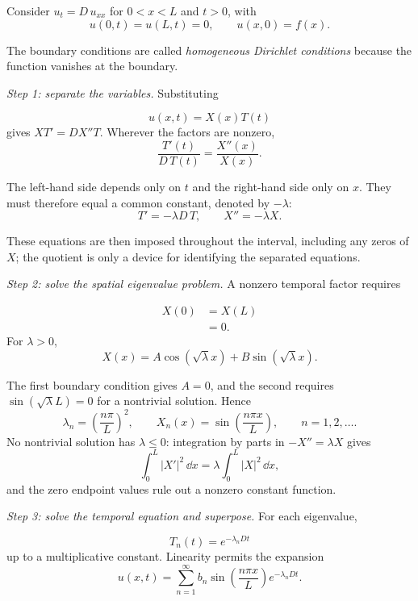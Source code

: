 \begin{example}
\label{ex:heat-separation}
Consider $u_t=D\,u_{xx}$ for $0<x<L$ and $t>0$, with
\[
u(0,t)=u(L,t)=0,\qquad u(x,0)=f(x).
\]

The boundary conditions are called \emph{homogeneous Dirichlet conditions} because the function vanishes at the boundary.

\textit{Step 1: separate the variables.} Substituting

\[
u(x,t)=X(x)T(t)
\]
gives $XT'=DX''T$. Wherever the factors are nonzero,
\begin{equation}
\frac{T'(t)}{D\,T(t)}=\frac{X''(x)}{X(x)}.
\end{equation}

The left-hand side depends only on $t$ and the right-hand side only on $x$. They must therefore equal a common constant, denoted by $-\lambda$:
\begin{equation}
T'=-\lambda D\,T,\qquad X''=-\lambda X.
\end{equation}

These equations are then imposed throughout the interval, including any zeros of $X$; the quotient is only a device for identifying the separated equations.

\textit{Step 2: solve the spatial eigenvalue problem.} A nonzero temporal factor requires

\[
\begin{aligned}
X(0) &= X(L) \\
&= 0.
\end{aligned}
\]
For $\lambda>0$,
\[
X(x)=A\cos(\sqrt\lambda x)+B\sin(\sqrt\lambda x).
\]

The first boundary condition gives $A=0$, and the second requires $\sin(\sqrt{\lambda} L)=0$ for a nontrivial solution. Hence
\begin{equation}
\lambda_n=\left(\frac{n\pi}{L}\right)^2,
\qquad X_n(x)=\sin\left(\frac{n\pi x}{L}\right),\qquad n=1,2,\dots.
\end{equation}
No nontrivial solution has $\lambda\le0$: integration by parts in $-X''=\lambda X$ gives
\[
\int_0^L|X'|^2\,\dd x=\lambda\int_0^L|X|^2\,\dd x,
\]
and the zero endpoint values rule out a nonzero constant function.

\textit{Step 3: solve the temporal equation and superpose.} For each eigenvalue,

\[
T_n(t)=e^{-\lambda_nDt}
\]
up to a multiplicative constant. Linearity permits the expansion
\begin{equation}
u(x,t)=\sum_{n=1}^{\infty}b_n\sin\left(\frac{n\pi x}{L}\right)e^{-\lambda_nDt}.
\end{equation}


\end{example}
